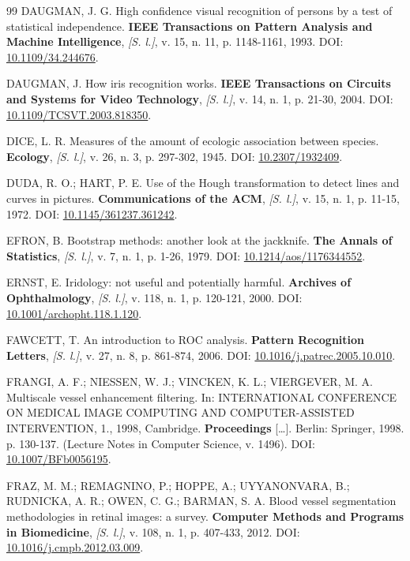 \documentclass[12pt, oneside, a4paper, chapter=TITLE, section=TITLE,
               english, brazil]{abntex2}
\newcommand{\doi}[1]{DOI: \href{https://doi.org/#1}{#1}}
\newcommand{\semlocal}{\textit{[S. l.]}}
\begin{document}
\begin{thebibliography}{99}
DAUGMAN, J. G. High confidence visual recognition of persons by a test of
statistical independence. \textbf{IEEE Transactions on Pattern Analysis and
Machine Intelligence}, \semlocal, v. 15, n. 11, p. 1148-1161, 1993.
\doi{10.1109/34.244676}.

DAUGMAN, J. How iris recognition works. \textbf{IEEE Transactions on Circuits
and Systems for Video Technology}, \semlocal, v. 14, n. 1, p. 21-30, 2004.
\doi{10.1109/TCSVT.2003.818350}.

DICE, L. R. Measures of the amount of ecologic association between species.
\textbf{Ecology}, \semlocal, v. 26, n. 3, p. 297-302, 1945.
\doi{10.2307/1932409}.

DUDA, R. O.; HART, P. E. Use of the Hough transformation to detect lines and
curves in pictures. \textbf{Communications of the ACM}, \semlocal, v. 15,
n. 1, p. 11-15, 1972. \doi{10.1145/361237.361242}.

EFRON, B. Bootstrap methods: another look at the jackknife. \textbf{The
Annals of Statistics}, \semlocal, v. 7, n. 1, p. 1-26, 1979.
\doi{10.1214/aos/1176344552}.

ERNST, E. Iridology: not useful and potentially harmful. \textbf{Archives of
Ophthalmology}, \semlocal, v. 118, n. 1, p. 120-121, 2000.
\doi{10.1001/archopht.118.1.120}.

FAWCETT, T. An introduction to ROC analysis. \textbf{Pattern Recognition
Letters}, \semlocal, v. 27, n. 8, p. 861-874, 2006.
\doi{10.1016/j.patrec.2005.10.010}.

FRANGI, A. F.; NIESSEN, W. J.; VINCKEN, K. L.; VIERGEVER, M. A. Multiscale
vessel enhancement filtering. In: INTERNATIONAL CONFERENCE ON MEDICAL IMAGE
COMPUTING AND COMPUTER-ASSISTED INTERVENTION, 1., 1998, Cambridge.
\textbf{Proceedings} [\dots]. Berlin: Springer, 1998. p. 130-137. (Lecture
Notes in Computer Science, v. 1496). \doi{10.1007/BFb0056195}.

FRAZ, M. M.; REMAGNINO, P.; HOPPE, A.; UYYANONVARA, B.; RUDNICKA, A. R.;
OWEN, C. G.; BARMAN, S. A. Blood vessel segmentation methodologies in retinal
images: a survey. \textbf{Computer Methods and Programs in Biomedicine},
\semlocal, v. 108, n. 1, p. 407-433, 2012. \doi{10.1016/j.cmpb.2012.03.009}.


\end{thebibliography}
\end{document}
